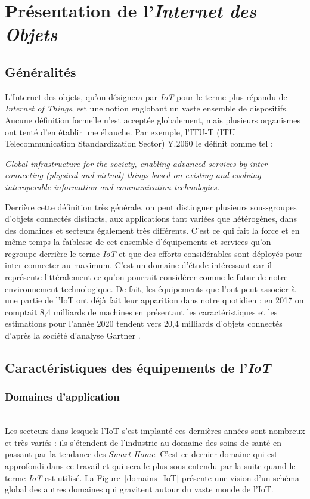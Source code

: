 \documentclass[]{article}
\begin{document}
\section{Présentation de l'\textit{Internet des Objets}}\label{IoT}

\subsection{Généralités}

\par L'Internet des objets, qu'on désignera par \textit{IoT} pour le terme plus répandu de \textit{Internet of Things}, est une notion englobant un vaste ensemble de dispositifs. Aucune définition formelle n'est acceptée globalement, mais plusieurs organismes ont tenté d'en établir une ébauche. Par exemple, l'ITU-T (ITU Telecommunication Standardization Sector) Y.2060 le définit comme tel : 
\begin{center}
\textit{\og Global  infrastructure  for  the  society,  enabling  advanced  services  by  inter-connecting (physical and virtual) things based on existing and evolving interoperable information and communication technologies. \fg}
\end{center}

\par Derrière cette définition très générale, on peut distinguer plusieurs sous-groupes d'objets connectés distincts, aux applications tant variées que hétérogènes, dans des domaines et secteurs également très différents. C'est ce qui fait la force et en même temps la faiblesse de cet ensemble d'équipements et services qu'on regroupe derrière le terme \textit{IoT} et que des efforts considérables sont déployés pour inter-connecter au maximum. C'est un domaine d'étude intéressant car il représente littéralement ce qu'on pourrait considérer comme le futur de notre environnement technologique. De fait, les équipements que l'ont peut associer à une partie de l'IoT ont déjà fait leur apparition dans notre quotidien : en 2017 on comptait 8,4 milliards de machines en présentant les caractéristiques et les estimations pour l'année 2020 tendent vers 20,4 milliards d'objets connectés d'après la société d'analyse Gartner \cite{Berte2018}.  
\subsection{Caractéristiques des équipements de l'\textit{IoT}}

\subsubsection{Domaines d'application}
~\\
Les secteurs dans lesquels l'IoT s'est implanté ces dernières années sont nombreux et très variés : ils s'étendent de l'industrie au domaine des soins de santé en passant par la tendance des \textit{Smart Home}. C'est ce dernier domaine qui est approfondi dans ce travail et qui sera le plus sous-entendu par la suite quand le terme \textit{IoT} est utilisé. La Figure~\ref{domains_IoT} présente une vision d'un schéma global des autres domaines qui gravitent autour du vaste monde de l'IoT.\\
\end{document}
